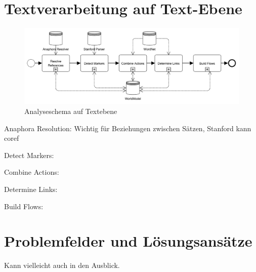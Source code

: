 \section{Textverarbeitung auf Text-Ebene}
\begin{figure}[H]
\begin{center}

\includegraphics[keepaspectratio=true, width=\textwidth]{pictures/textLevel.png}
\caption{Analyseschema auf Textebene}
\label{fig:TLEVEL}
\end{center}\end{figure}

Anaphora Resolution: Wichtig für Beziehungen zwischen Sätzen, Stanford kann coref

Detect Markers:  

Combine Actions:

Determine Links:

Build Flows:

\section{Problemfelder und Lösungsansätze}
Kann vielleicht auch in den Ausblick.



